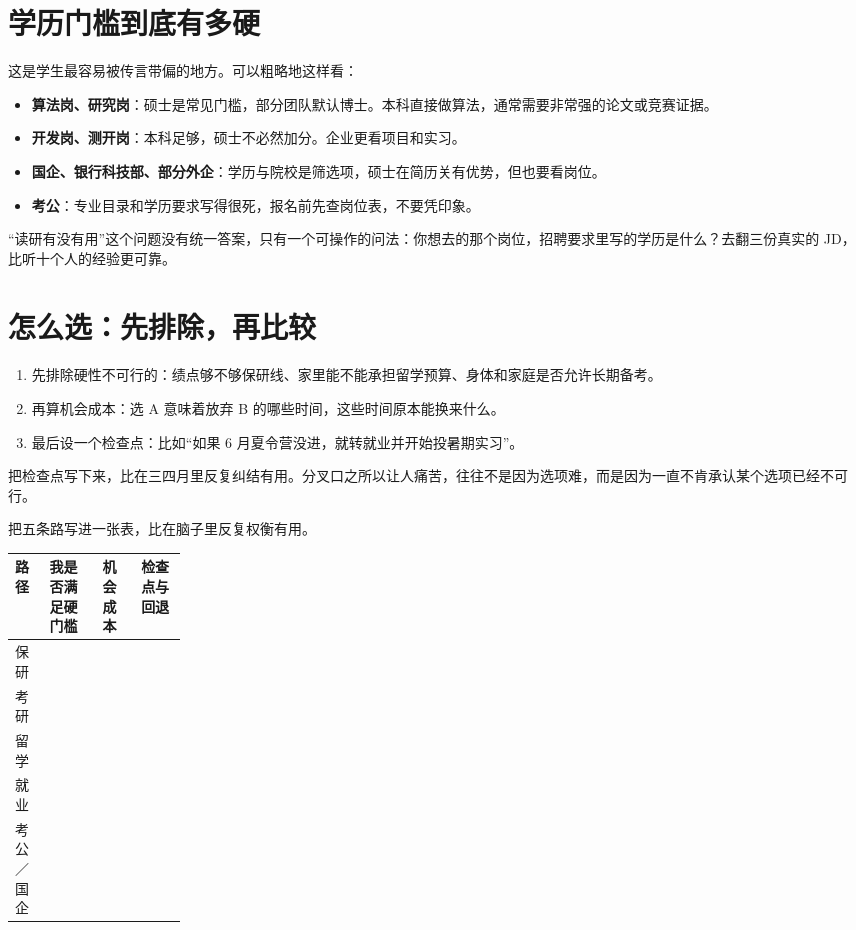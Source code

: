 \documentclass[UTF8,zihao=5,openany]{ctexbook}
\begin{document}
\section{学历门槛到底有多硬}
这是学生最容易被传言带偏的地方。可以粗略地这样看：

\begin{itemize}
\item \textbf{算法岗、研究岗}：硕士是常见门槛，部分团队默认博士。本科直接做算法，通常需要非常强的论文或竞赛证据。
\item \textbf{开发岗、测开岗}：本科足够，硕士不必然加分。企业更看项目和实习。
\item \textbf{国企、银行科技部、部分外企}：学历与院校是筛选项，硕士在简历关有优势，但也要看岗位。
\item \textbf{考公}：专业目录和学历要求写得很死，报名前先查岗位表，不要凭印象。
\end{itemize}

“读研有没有用”这个问题没有统一答案，只有一个可操作的问法：你想去的那个岗位，招聘要求里写的学历是什么？去翻三份真实的 JD，比听十个人的经验更可靠。

\section{怎么选：先排除，再比较}
\begin{enumerate}
\item 先排除硬性不可行的：绩点够不够保研线、家里能不能承担留学预算、身体和家庭是否允许长期备考。
\item 再算机会成本：选 A 意味着放弃 B 的哪些时间，这些时间原本能换来什么。
\item 最后设一个检查点：比如“如果 6 月夏令营没进，就转就业并开始投暑期实习”。
\end{enumerate}

把检查点写下来，比在三四月里反复纠结有用。分叉口之所以让人痛苦，往往不是因为选项难，而是因为一直不肯承认某个选项已经不可行。

把五条路写进一张表，比在脑子里反复权衡有用。
\begin{toolbox}
\begin{center}\small
\begin{tabularx}{0.92\linewidth}{p{0.20\linewidth}YYY}
\toprule
路径 & 我是否满足硬门槛 & 机会成本 & 检查点与回退 \\
\midrule
保研 & & & \\
考研 & & & \\
留学 & & & \\
就业 & & & \\
考公／国企 & & & \\
\bottomrule
\end{tabularx}
\end{center}
\end{toolbox}
\end{document}
